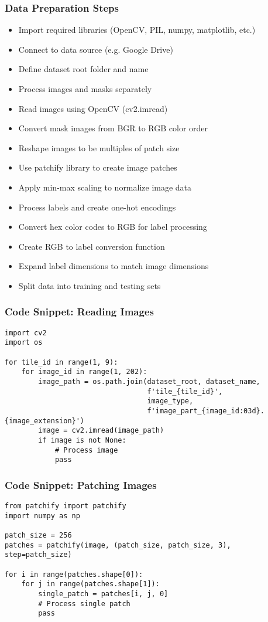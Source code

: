 \begin{frame}[fragile]\frametitle{Data Preparation Steps}
\begin{itemize}
\item Import required libraries (OpenCV, PIL, numpy, matplotlib, etc.)
\item Connect to data source (e.g. Google Drive)
\item Define dataset root folder and name
\item Process images and masks separately
\item Read images using OpenCV (cv2.imread)
\item Convert mask images from BGR to RGB color order
\item Reshape images to be multiples of patch size
\item Use patchify library to create image patches
\item Apply min-max scaling to normalize image data
\item Process labels and create one-hot encodings
\item Convert hex color codes to RGB for label processing
\item Create RGB to label conversion function
\item Expand label dimensions to match image dimensions
\item Split data into training and testing sets
\end{itemize}
\end{frame}

\begin{frame}[fragile]\frametitle{Code Snippet: Reading Images}
\begin{lstlisting}
import cv2
import os

for tile_id in range(1, 9):
    for image_id in range(1, 202):
        image_path = os.path.join(dataset_root, dataset_name, 
                                  f'tile_{tile_id}', 
                                  image_type, 
                                  f'image_part_{image_id:03d}.{image_extension}')
        image = cv2.imread(image_path)
        if image is not None:
            # Process image
            pass
\end{lstlisting}
\end{frame}

\begin{frame}[fragile]\frametitle{Code Snippet: Patching Images}
\begin{lstlisting}
from patchify import patchify
import numpy as np

patch_size = 256
patches = patchify(image, (patch_size, patch_size, 3), step=patch_size)

for i in range(patches.shape[0]):
    for j in range(patches.shape[1]):
        single_patch = patches[i, j, 0]
        # Process single patch
        pass
\end{lstlisting}
\end{frame}

